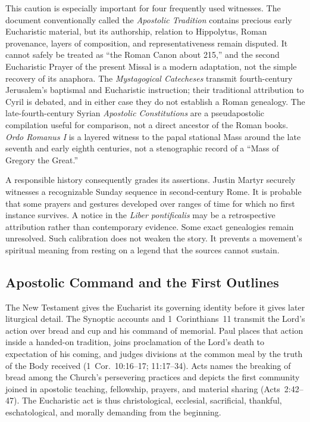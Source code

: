 This caution is especially important for four frequently used witnesses. The document conventionally called the \emph{Apostolic Tradition} contains precious early Eucharistic material, but its authorship, relation to Hippolytus, Roman provenance, layers of composition, and representativeness remain disputed. It cannot safely be treated as ``the Roman Canon about 215,'' and the second Eucharistic Prayer of the present Missal is a modern adaptation, not the simple recovery of its anaphora. The \emph{Mystagogical Catecheses} transmit fourth-century Jerusalem's baptismal and Eucharistic instruction; their traditional attribution to Cyril is debated, and in either case they do not establish a Roman genealogy. The late-fourth-century Syrian \emph{Apostolic Constitutions} are a pseudapostolic compilation useful for comparison, not a direct ancestor of the Roman books. \emph{Ordo Romanus I} is a layered witness to the papal stational Mass around the late seventh and early eighth centuries, not a stenographic record of a ``Mass of Gregory the Great.''

A responsible history consequently grades its assertions. Justin Martyr securely witnesses a recognizable Sunday sequence in second-century Rome. It is probable that some prayers and gestures developed over ranges of time for which no first instance survives. A notice in the \emph{Liber pontificalis} may be a retrospective attribution rather than contemporary evidence. Some exact genealogies remain unresolved. Such calibration does not weaken the story. It prevents a movement's spiritual meaning from resting on a legend that the sources cannot sustain.

\subsection{Apostolic Command and the First Outlines}

The New Testament gives the Eucharist its governing identity before it gives later liturgical detail. The Synoptic accounts and 1~Corinthians~11 transmit the Lord's action over bread and cup and his command of memorial. Paul places that action inside a handed-on tradition, joins proclamation of the Lord's death to expectation of his coming, and judges divisions at the common meal by the truth of the Body received (1~Cor.~10:16--17; 11:17--34). Acts names the breaking of bread among the Church's persevering practices and depicts the first community joined in apostolic teaching, fellowship, prayers, and material sharing (Acts~2:42--47). The Eucharistic act is thus christological, ecclesial, sacrificial, thankful, eschatological, and morally demanding from the beginning.

